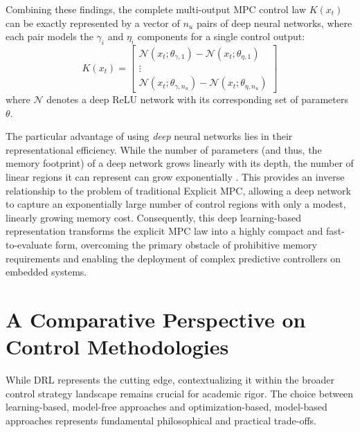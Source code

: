 Combining these findings, the complete multi-output MPC control law $K(x_t)$ can be exactly represented by a vector of $n_u$ pairs of deep neural networks, where each pair models the $\gamma_i$ and $\eta_i$ components for a single control output:
\begin{equation}
    K(x_t) = 
    \begin{bmatrix}
        \mathcal{N}(x_t; \theta_{\gamma,1}) - \mathcal{N}(x_t; \theta_{\eta,1}) \\
        \vdots \\
        \mathcal{N}(x_t; \theta_{\gamma,n_u}) - \mathcal{N}(x_t; \theta_{\eta,n_u})
    \end{bmatrix}
\end{equation}
where $\mathcal{N}$ denotes a deep ReLU network with its corresponding set of parameters $\theta$.

The particular advantage of using \textit{deep} neural networks lies in their representational efficiency. While the number of parameters (and thus, the memory footprint) of a deep network grows linearly with its depth, the number of linear regions it can represent can grow exponentially \cite{karg2018efficient}. This provides an inverse relationship to the problem of traditional Explicit MPC, allowing a deep network to capture an exponentially large number of control regions with only a modest, linearly growing memory cost. Consequently, this deep learning-based representation transforms the explicit MPC law into a highly compact and fast-to-evaluate form, overcoming the primary obstacle of prohibitive memory requirements and enabling the deployment of complex predictive controllers on embedded systems.


\section{A Comparative Perspective on Control Methodologies}

While DRL represents the cutting edge, contextualizing it within the broader control strategy landscape remains crucial for academic rigor. The choice between learning-based, model-free approaches and optimization-based, model-based approaches represents fundamental philosophical and practical trade-offs.

